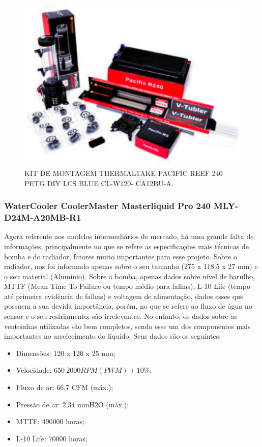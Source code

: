 \begin{figure}[!htb]                                                               
   \centering                                                                      
   \includegraphics[scale=0.4, keepaspectratio=true]{figuras/watercooler1.eps}
   \caption{KIT DE MONTAGEM THERMALTAKE PACIFIC REEF 240 PETG DIY LCS BLUE CL-W120- CA12BU-A.}               
\end{figure}

\subsubsection{WaterCooler CoolerMaster Masterliquid Pro 240 MLY-D24M-A20MB-R1}

Agora referente aos modelos intermediários de mercado, há uma grande falta de informações, principalmente no que se refere as especificações mais técnicas de bomba e do radiador, fatores muito importantes para esse projeto. Sobre o radiador, nos foi informado apenas sobre o seu tamanho (275 x 118.5 x 27 mm) e o seu material (Alumínio). Sobre a bomba, apenas dados sobre nível de barulho, MTTF (Mean Time To Failure ou tempo médio para falhas), L-10 Life (tempo até primeira evidência de falhas) e voltagem de alimentação, dados esses que possuem a sua devida importância, porém, no que se refere ao fluxo de água no sensor e o seu resfriamento, são irrelevantes.
No entanto, os dados sobre as ventoinhas utilizadas são bem completos, sendo esse um dos componentes mais importantes no arrefecimento do líquido. Seus dados são os seguintes:

\begin{itemize}
\item Dimensões: 120 x 120 x 25 mm;
\item Velocidade: $650 ~ 2000 RPM (PWM) \pm 10$\%;
\item Fluxo de ar: 66,7 CFM (máx.);
\item Pressão de ar: 2,34 mmH2O (máx.);
\item MTTF: 490000 horas;
\item L-10 Life: 70000 horas;
\end{itemize}

